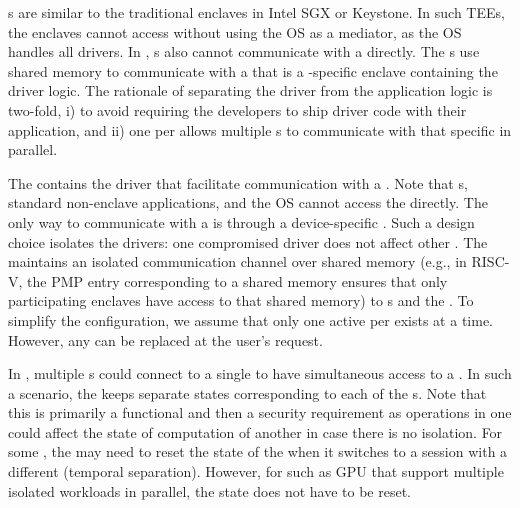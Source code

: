  \App{}s are similar to the traditional enclaves in Intel SGX or Keystone. In such TEEs, the enclaves cannot access \sphw without using the OS as a mediator, as the OS handles all drivers. In \name, \app{}s also cannot communicate with a \sphw directly. The \app{}s use shared memory to communicate with a \ce that is a \sphw-specific enclave containing the driver logic. The rationale of separating the driver from the application logic is two-fold, i) to avoid requiring the developers to ship driver code with their application, and ii) one \ce per \sphw allows multiple \app{}s to communicate with that specific \sphw in parallel. %


 The \ce contains the driver that facilitate communication with a \sphw. Note that \app{}s, standard non-enclave applications, and the OS cannot access the \sphw directly. The only way to communicate with a \sphw is through a device-specific \ce. Such a design choice isolates the \sphw drivers: one compromised driver does not affect other \sphw. The \ce maintains an isolated communication channel over shared memory (e.g., in RISC-V, the PMP entry corresponding to a shared memory ensures that only participating enclaves have access to that shared memory) to \app{}s and the \sphw. To simplify the configuration, we assume that only one active \ce per \sphw exists at a time. However, any \ce can be replaced at the user's request. %

\label{sec:programmingModel:systemComponents:multiApp} In \name, multiple \app{}s could connect to a single \ce to have simultaneous access to a \sphw. In such a scenario, the \ce keeps separate states corresponding to each of the \app{}s. Note that this is primarily a functional and then a security requirement as operations in one \app could affect the state of computation of another \app in case there is no isolation. For some \sphw, the \ce may need to reset the state of the \sphw when it switches to a session with a different \app (temporal separation). However, for \sphw such as GPU that support multiple isolated workloads in parallel, the state does not have to be reset.


